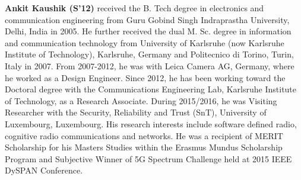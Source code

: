 \documentclass[journal, twocolumn]{IEEEtran}
\begin{document}
\begin{IEEEbiography}
{\textbf{Ankit Kaushik (S'12)}} received the B. Tech degree in electronics and communication engineering from Guru Gobind Singh Indraprastha University, Delhi, India in 2005. He further received the dual M. Sc. degree in information and communication technology from University of Karlsruhe (now Karlsruhe Institute of Technology), Karlsruhe, Germany and Politecnico di Torino, Turin, Italy in 2007. From 2007-2012, he was with Leica Camera AG, Germany, where he worked as a Design Engineer. Since 2012, he has been working toward the Doctoral degree with the Communications Engineering Lab, Karlsruhe Institute of Technology, as a Research Associate. During 2015/2016, he was Visiting Researcher with the Security, Reliability and Trust (SnT), University of Luxembourg, Luxembourg. His research interests include software defined radio, cognitive radio communications and networks. He was a recipient of MERIT Scholarship for his Masters Studies within the Erasmus Mundus Scholarship Program and Subjective Winner of 5G Spectrum Challenge held at 2015 IEEE DySPAN Conference. 
\end{IEEEbiography}
\end{document}
